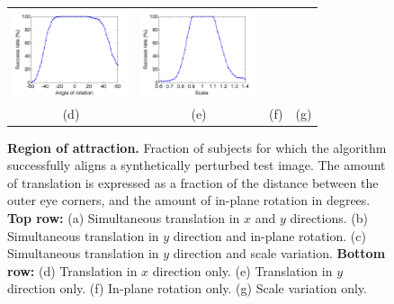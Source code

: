 \documentclass[10pt,journal,letterpaper,compsoc]{IEEEtran} %
\begin{document}
\begin{figure}
{\begin{tabular}{cccc}
\includegraphics[height=1in]{figures_pami/theta.png} &
\includegraphics[height=1in]{figures_pami/scale.png}\\
(d)&(e)&(f)& (g)
\end{tabular}
\vspace{0mm}
}
\caption{{\bf Region of attraction.} Fraction of subjects for which the algorithm successfully aligns a synthetically perturbed test image.  The amount of translation is expressed as a fraction of the distance between the outer eye corners, and the amount of in-plane rotation in degrees. {\bf Top row:} (a) Simultaneous translation in $x$ and $y$ directions. (b) Simultaneous translation in $y$ direction and in-plane rotation. (c) Simultaneous translation in $y$ direction and scale variation. {\bf Bottom row:} (d) Translation in $x$ direction only. (e) Translation in $y$ direction only. (f) In-plane rotation only. (g) Scale variation only.}
\label{fig:attraction}
\vspace{0mm}
\end{figure}
\end{document}
